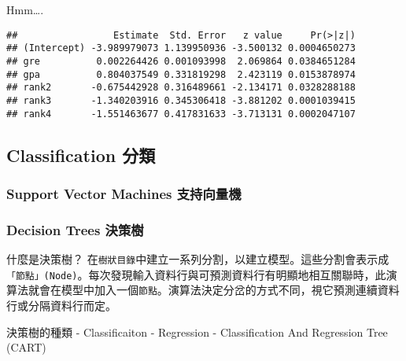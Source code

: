 \documentclass[]{book}
\newenvironment{Shaded}{\begin{snugshade}}{\end{snugshade}}
\newcommand{\KeywordTok}[1]{\textcolor[rgb]{0.13,0.29,0.53}{\textbf{{#1}}}}
\newcommand{\DataTypeTok}[1]{\textcolor[rgb]{0.13,0.29,0.53}{{#1}}}
\newcommand{\StringTok}[1]{\textcolor[rgb]{0.31,0.60,0.02}{{#1}}}
\newcommand{\NormalTok}[1]{{#1}}
\begin{document}
Hmm\ldots{}.

\begin{Shaded}
\end{Shaded}

\begin{verbatim}
##                 Estimate  Std. Error   z value     Pr(>|z|)
## (Intercept) -3.989979073 1.139950936 -3.500132 0.0004650273
## gre          0.002264426 0.001093998  2.069864 0.0384651284
## gpa          0.804037549 0.331819298  2.423119 0.0153878974
## rank2       -0.675442928 0.316489661 -2.134171 0.0328288188
## rank3       -1.340203916 0.345306418 -3.881202 0.0001039415
## rank4       -1.551463677 0.417831633 -3.713131 0.0002047107
\end{verbatim}

\subsection{Classification 分類}\label{classification-}

\subsubsection{Support Vector Machines
支持向量機}\label{support-vector-machines-}

\subsubsection{Decision Trees 決策樹}\label{decision-trees-}

什麼是決策樹？
在\texttt{樹狀目錄}中建立一系列分割，以建立模型。這些分割會表示成\texttt{「節點」(Node)}。每次發現輸入資料行與可預測資料行有明顯地相互關聯時，此演算法就會在模型中加入一個\texttt{節點}。演算法決定分岔的方式不同，視它預測連續資料行或分隔資料行而定。

決策樹的種類 - Classificaiton - Regression - Classification And
Regression Tree (CART)
\end{document}
